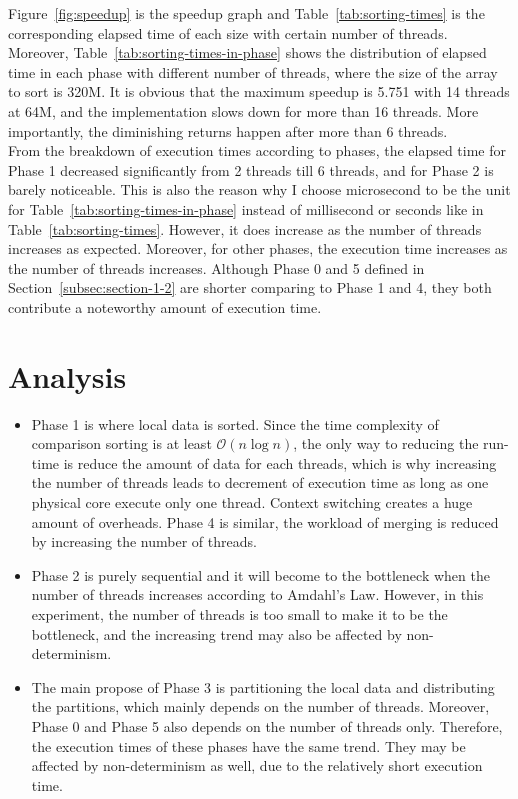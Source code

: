 \documentclass[11pt]{article}
\begin{document}
    Figure~\ref{fig:speedup} is the speedup graph and Table~\ref{tab:sorting-times} is the corresponding elapsed time of each size with certain number of threads.
    Moreover, Table~\ref{tab:sorting-times-in-phase} shows the distribution of elapsed time in each phase with different number of threads, where the size of the array to sort is 320M. It is obvious that the maximum speedup is 5.751 with 14 threads at 64M, and the implementation slows down for more than 16 threads.
    More importantly, the diminishing returns happen after more than 6 threads. \\
    From the breakdown of execution times according to phases, the elapsed time for Phase 1 decreased significantly from 2 threads till 6 threads, and for Phase 2 is barely noticeable.
    This is also the reason why I choose microsecond to be the unit for Table~\ref{tab:sorting-times-in-phase} instead of millisecond or seconds like in Table~\ref{tab:sorting-times}.
    However, it does increase as the number of threads increases as expected.
    Moreover, for other phases, the execution time increases as the number of threads increases.
    Although Phase 0 and 5 defined in Section~\ref{subsec:section-1-2} are shorter comparing to Phase 1 and 4, they both contribute a noteworthy amount of execution time.


    \section{Analysis}
    \label{sec:section-4}
    \begin{itemize}
        \item Phase 1 is where local data is sorted.
        Since the time complexity of comparison sorting is at least $\mathcal{O}(n\log n)$, the only way to reducing the run-time is reduce the amount of data for each threads, which is why increasing the number of threads leads to decrement of execution time as long as one physical core execute only one thread.
        Context switching creates a huge amount of overheads.
        Phase 4 is similar, the workload of merging is reduced by increasing the number of threads.
        \item Phase 2 is purely sequential and it will become to the bottleneck when the number of threads increases according to Amdahl's Law.
        However, in this experiment, the number of threads is too small to make it to be the bottleneck, and the increasing trend may also be affected by non-determinism.
        \item The main propose of Phase 3 is partitioning the local data and distributing the partitions, which mainly depends on the number of threads.
        Moreover, Phase 0 and Phase 5 also depends on the number of threads only.
        Therefore, the execution times of these phases have the same trend.
        They may be affected by non-determinism as well, due to the relatively short execution time.
    \end{itemize}
\end{document}
